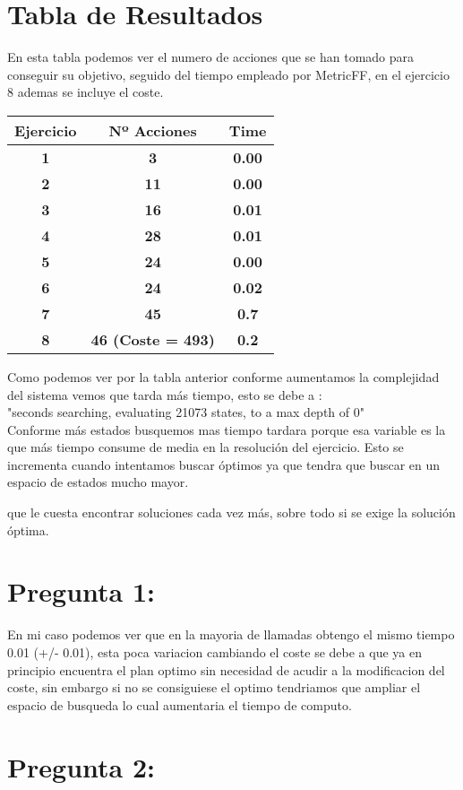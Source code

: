\section{Tabla de Resultados}
En esta tabla podemos ver el numero de acciones que se han tomado para conseguir su objetivo,
seguido del tiempo empleado por MetricFF, en el ejercicio 8 ademas se incluye el coste.
\begin{table}[H]
  \centering
  \begin{tabular}{|c|c|c|}
  \hline
  \textbf{Ejercicio} & \textbf{Nº Acciones}      & \textbf{Time} \\ \hline
  \textbf{1}         & \textbf{3}                & \textbf{0.00}    \\ \hline
  \textbf{2}         & \textbf{11}               & \textbf{0.00}    \\ \hline
  \textbf{3}         & \textbf{16}               & \textbf{0.01} \\ \hline
  \textbf{4}         & \textbf{28}               & \textbf{0.01} \\ \hline
  \textbf{5}         & \textbf{24}               & \textbf{0.00} \\ \hline
  \textbf{6}         & \textbf{24}               & \textbf{0.02} \\ \hline
  \textbf{7}         & \textbf{45}               & \textbf{0.7}  \\ \hline
  \textbf{8}         & \textbf{46 (Coste = 493)} & \textbf{0.2}  \\ \hline
  \end{tabular}
  \end{table}


Como podemos ver por la tabla anterior conforme aumentamos la complejidad del sistema
vemos que tarda más tiempo, esto se debe a : \\
"seconds searching, evaluating 21073 states, to a max depth of 0"\\
Conforme más estados busquemos mas tiempo tardara porque esa variable es la que más tiempo consume de media
en la resolución del ejercicio.
Esto se incrementa cuando intentamos buscar óptimos ya que tendra que buscar en un espacio de estados mucho mayor.
  
que le cuesta encontrar soluciones cada vez más, sobre todo si se exige la solución óptima.
  

\section{Pregunta 1:  }
En mi caso podemos ver que en la mayoria de llamadas obtengo el mismo tiempo 0.01 (+/- 0.01), esta poca 
variacion cambiando el coste se debe a que ya en principio encuentra el plan optimo sin necesidad de acudir a 
la modificacion del coste, sin embargo si no se consiguiese el optimo tendriamos que ampliar el espacio de busqueda 
lo cual aumentaria el tiempo de computo.

\section{Pregunta 2:}



